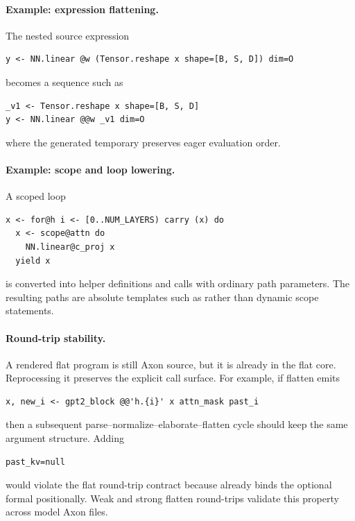 \paragraph{Example: expression flattening.}
The nested source expression
\begin{verbatim}
y <- NN.linear @w (Tensor.reshape x shape=[B, S, D]) dim=O
\end{verbatim}
becomes a sequence such as
\begin{verbatim}
_v1 <- Tensor.reshape x shape=[B, S, D]
y <- NN.linear @@w _v1 dim=O
\end{verbatim}
where the generated temporary preserves eager evaluation order.

\paragraph{Example: scope and loop lowering.}
A scoped loop
\begin{verbatim}
x <- for@h i <- [0..NUM_LAYERS) carry (x) do
  x <- scope@attn do
    NN.linear@c_proj x
  yield x
\end{verbatim}
is converted into helper definitions and calls with ordinary path parameters.
The resulting paths are absolute templates such as
 rather than dynamic scope statements.

\paragraph{Round-trip stability.}
A rendered flat program is still Axon source, but it is already in the flat
core.  Reprocessing it preserves the explicit call surface.  For example,
if flatten emits
\begin{verbatim}
x, new_i <- gpt2_block @@'h.{i}' x attn_mask past_i
\end{verbatim}
then a subsequent parse--normalize--elaborate--flatten cycle should keep the
same argument structure.  Adding
\begin{verbatim}
past_kv=null
\end{verbatim}
would violate the flat round-trip contract because  already binds
the optional  formal positionally.  Weak and strong flatten
round-trips validate this property across model Axon files.
